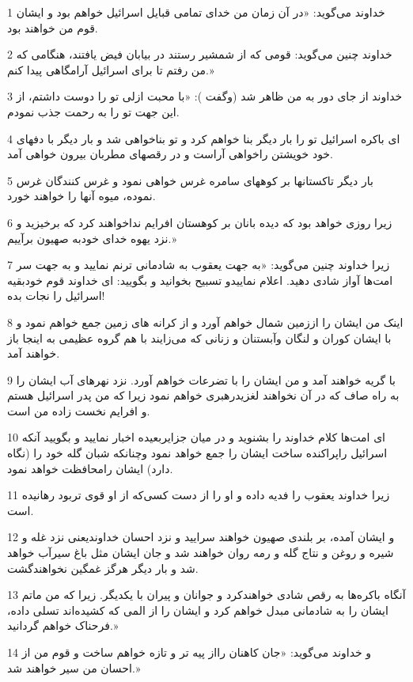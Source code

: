 \par 1 خداوند می‌گوید: «در آن زمان من خدای تمامی قبایل اسرائیل خواهم بود و ایشان قوم من خواهند بود.
\par 2 خداوند چنین می‌گوید: قومی که از شمشیر رستند در بیابان فیض یافتند، هنگامی که من رفتم تا برای اسرائیل آرامگاهی پیدا کنم.»
\par 3 خداوند از جای دور به من ظاهر شد (وگفت ): «با محبت ازلی تو را دوست داشتم، از این جهت تو را به رحمت جذب نمودم.
\par 4 ‌ای باکره اسرائیل تو را بار دیگر بنا خواهم کرد و تو بناخواهی شد و بار دیگر با دفهای خود خویشتن راخواهی آراست و در رقصهای مطربان بیرون خواهی آمد.
\par 5 بار دیگر تاکستانها بر کوههای سامره غرس خواهی نمود و غرس کنندگان غرس نموده، میوه آنها را خواهند خورد.
\par 6 زیرا روزی خواهد بود که دیده بانان بر کوهستان افرایم نداخواهند کرد که برخیزید و نزد یهوه خدای خودبه صهیون برآییم.»
\par 7 زیرا خداوند چنین می‌گوید: «به جهت یعقوب به شادمانی ترنم نمایید و به جهت سر امت‌ها آواز شادی دهید. اعلام نماییدو تسبیح بخوانید و بگویید: ای خداوند قوم خودبقیه اسرائیل را نجات بده!
\par 8 اینک من ایشان را اززمین شمال خواهم آورد و از کرانه های زمین جمع خواهم نمود و با ایشان کوران و لنگان وآبستنان و زنانی که می‌زایند با هم گروه عظیمی به اینجا باز خواهند آمد.
\par 9 با گریه خواهند آمد و من ایشان را با تضرعات خواهم آورد. نزد نهرهای آب ایشان را به راه صاف که در آن نخواهند لغزیدرهبری خواهم نمود زیرا که من پدر اسرائیل هستم و افرایم نخست زاده من است.
\par 10 ‌ای امت‌ها کلام خداوند را بشنوید و در میان جزایربعیده اخبار نمایید و بگویید آنکه اسرائیل راپراکنده ساخت ایشان را جمع خواهد نمود وچنانکه شبان گله خود را (نگاه دارد) ایشان رامحافظت خواهد نمود.
\par 11 زیرا خداوند یعقوب را فدیه داده و او را از دست کسی‌که از او قوی تربود رهانیده است.
\par 12 و ایشان آمده، بر بلندی صهیون خواهند سرایید و نزد احسان خداوندیعنی نزد غله و شیره و روغن و نتاج گله و رمه روان خواهند شد و جان ایشان مثل باغ سیرآب خواهد شد و بار دیگر هرگز غمگین نخواهندگشت.
\par 13 آنگاه باکره‌ها به رقص شادی خواهندکرد و جوانان و پیران با یکدیگر. زیرا که من ماتم ایشان را به شادمانی مبدل خواهم کرد و ایشان را از المی که کشیده‌اند تسلی داده، فرحناک خواهم گردانید.»
\par 14 و خداوند می‌گوید: «جان کاهنان رااز پیه تر و تازه خواهم ساخت و قوم من از احسان من سیر خواهند شد.»
